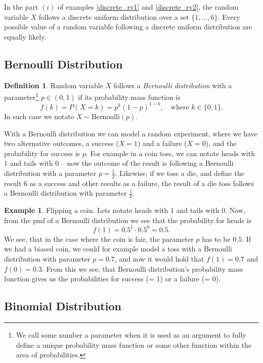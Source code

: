 \documentclass[12pt,a4paper,leqno]{report}
\theoremstyle{plain}
\theoremstyle{definition}
\newtheorem{maar}[equation]{Definition}
\newtheorem{esim}[equation]{Example}
\begin{document}
In the part $(i)$ of examples \ref{discrete_rv1} and \ref{discrete_rv2}, the random variable $X$ follows a discrete uniform distribution over a set $\{1, \dots, 6\}$. Every possible value of a random variable following a discrete uniform distribution are equally likely.

\subsection{Bernoulli Distribution}\label{bernoulli_distr}

\begin{maar}
Random variable $X$ follows a \emph{Bernoulli distribution}  with a parameter\footnote{We call some number a parameter when it is used as an argument to fully define a unique probability mass function or some other function within the area of probabilities.} $p \in (0,1)$ if its probability mass function is 
\[
f(k) = P(X=k) = p^k(1-p)^{1-k}, \quad \text{where } k \in \{0, 1\}.
\]
In such case we notate $X \sim \text{Bernoulli}(p)$.
\end{maar}

With a Bernoulli distribution we can model a random experiment, where we have two alternative outcomes, a success ($X=1$) and a failure ($X=0$), and the probability for success is $p$. For example in a coin toss, we can notate heads with $1$ and tails with $0$ -- now the outcome of the result is following a Bernoulli distribution with a parameter $p=\frac{1}{2}$. Likewise, if we toss a die, and define the result $6$ as a success and other results as a failure, the result of a die toss follows a Bernoulli distribution with parameter $\frac{1}{6}$. 

\begin{esim}
Flipping a coin. Lets notate heads with $1$ and tails with $0$. Now, from the pmf of a Bernoulli distribution we see that the probability for heads is 
\[
f(1) = 0.5^1 \cdot 0.5^0 = 0.5.
\]
We see, that in the case where the coin is fair, the parameter $p$ has to be $0.5$. If we had a biased coin, we could for example model a toss with a Bernoulli distribution with parameter $p=0.7$, and now it would hold that $f(1) = 0.7$ and $f(0) = 0.3$. From this we see, that Bernoulli distribution's probability mass function gives us the probabilities for success (= 1) or a failure (= 0). 
\end{esim}

\subsection{Binomial Distribution}\label{binomial_distr}
\end{document}
